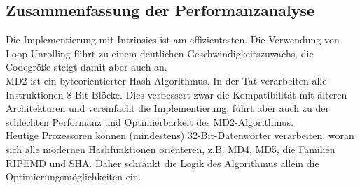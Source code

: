 \subsection{Zusammenfassung der Performanzanalyse}
Die Implementierung mit Intrinsics ist am effizientesten.
Die Verwendung von Loop Unrolling führt zu einem deutlichen Geschwindigkeitszuwachs,
die Codegröße steigt damit aber auch an.
\\
MD2 ist ein byteorientierter Hash-Algorithmus.\cite{rfc1319}
In der Tat verarbeiten alle Instruktionen 8-Bit Blöcke.
Dies verbessert zwar die Kompatibilität mit älteren Architekturen und vereinfacht die
Implementierung, führt aber auch
zu der schlechten Performanz und Optimierbarkeit des MD2-Algorithmus.
\\
Heutige Prozessoren können (mindestens) 32-Bit-Datenwörter verarbeiten, woran sich alle
modernen Hashfunktionen orienteren, z.B. MD4, MD5, die Familien RIPEMD
und SHA.
Daher schränkt die Logik des Algorithmus allein die Optimierungsmöglichkeiten ein.